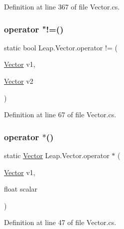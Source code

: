 Definition at line 367 of file Vector.\+cs.

\mbox{\label{struct_leap_1_1_vector_a6c834842a05008442e86353a7209d17b}} 
\subsubsection{\texorpdfstring{operator "!=()}{operator !=()}}
{\footnotesize\ttfamily static bool Leap.\+Vector.\+operator != (\begin{DoxyParamCaption}\item[{\mbox{\hyperlink{struct_leap_1_1_vector}{Vector}}}]{v1,  }\item[{\mbox{\hyperlink{struct_leap_1_1_vector}{Vector}}}]{v2 }\end{DoxyParamCaption})\hspace{0.3cm}{\ttfamily [static]}}



Definition at line 67 of file Vector.\+cs.

\mbox{\label{struct_leap_1_1_vector_a9189471d23ea61609806cbee7b1808bf}} 
\subsubsection{\texorpdfstring{operator $\ast$()}{operator *()}\hspace{0.1cm}{\footnotesize\ttfamily [1/2]}}
{\footnotesize\ttfamily static \mbox{\hyperlink{struct_leap_1_1_vector}{Vector}} Leap.\+Vector.\+operator $\ast$ (\begin{DoxyParamCaption}\item[{\mbox{\hyperlink{struct_leap_1_1_vector}{Vector}}}]{v1,  }\item[{float}]{scalar }\end{DoxyParamCaption})\hspace{0.3cm}{\ttfamily [static]}}



Definition at line 47 of file Vector.\+cs.

\mbox{\label{struct_leap_1_1_vector_a7a1839d6ea30d92eb3a7591b73c41a63}} 
